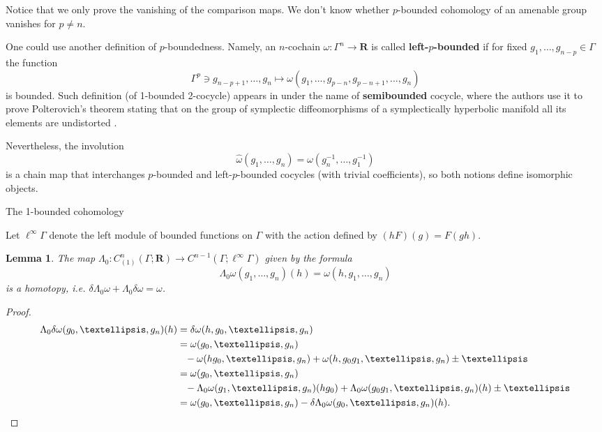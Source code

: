 \documentclass[12pt,reqno,a4paper]{amsart}
\makeatletter
\def\section{\@startsection{section}{1}%
  \z@{.7\linespacing\@plus\linespacing}{.5\linespacing}%
  {\normalfont\bfseries\raggedright\boldmath}}
\renewcommand{\emph}[1]{{\bfseries\boldmath #1}}
\newtheorem{lemma}[subsection]{Lemma}
\theoremstyle{definition}
\theoremstyle{remark}
\newenvironment{remark}
    {\pushQED{\qed}\renewcommand{\qedsymbol}{$\lozenge$}\remarkx}
    {\popQED\endremarkx}
\numberwithin{equation}{section}
\numberwithin{figure}{section}
\newcommand{\B}[1]{{\mathbf #1}}
\makeatother
\begin{document}
\begin{remark}
Notice that we only prove the vanishing of the comparison maps. We don't know
whether $p$-bounded cohomology of an amenable group vanishes for $p\neq n$.
\end{remark}

\begin{remark}  One could use another definition of $p$-boundedness.
Namely, an $n$-cochain
$\omega \colon \Gamma^n\to \B R$ is called \emph{left-$p$-bounded} if for fixed
$g_1,\dots,g_{n-p}\in \Gamma$ the function
$$
\Gamma^p\ni g_{n-p+1},\dots,g_n \mapsto \omega(g_1,\dots,g_{p-n},g_{p-n+1},\dots,g_n)
$$
is bounded.  Such definition (of 1-bounded 2-cocycle) appears in \cite[Section 4]{zbMATH06065373}
under the name of \emph{semibounded} cocycle, where the authors use it
to prove Polterovich's theorem stating that
on the group of symplectic diffeomorphisms of a symplectically hyperbolic
manifold all its elements are undistorted \cite[Theorem 5.2]{zbMATH06065373}.

Nevertheless, the involution
$$\widehat\omega(g_1,\dots,g_n)=\omega(g_n^{-1},\dots,g_1^{-1})
$$
is a chain map that interchanges $p$-bounded and left-$p$-bounded cocycles
(with trivial coefficients), so both notions define isomorphic objects.
\end{remark}


\section{The 1-bounded cohomology}\label{L:last}

Let $\ell^\infty\Gamma$ denote the left module of bounded functions on $\Gamma$
with the action defined by $(hF)(g)=F(gh)$.

\begin{lemma}\label{L:lgamma}
The map $\Lambda_0\colon C^n_{(1)}(\Gamma;\B R)\to C^{n-1}(\Gamma;\ell^\infty\Gamma)$
given by the formula
$$
\Lambda_0\omega(g_1,\dots,g_n)(h)=\omega(h,g_1,\dots,g_n)
$$
is a homotopy, \textit{i.e.} $\delta\Lambda_0\omega+\Lambda_0\delta\omega=\omega$.
\end{lemma}

\begin{proof}
\begin{align*}
\Lambda_0\delta\omega(g_0,\dots,g_n)(h)&=\delta\omega(h,g_0,\dots,g_n)\\
&=\omega(g_0,\dots,g_n)\\
&\hphantom{=}-\omega(hg_0,\dots,g_n)+\omega(h,g_0g_1,\dots,g_n)\pm\dots\\
&=\omega(g_0,\dots,g_n)\\
&\hphantom{=}-\Lambda_0\omega(g_1,\dots,g_n)(hg_0)+\Lambda_0\omega(g_0g_1,\dots,g_n)(h)\pm\dots\\
&=\omega(g_0,\dots,g_n)-\delta\Lambda_0\omega(g_0,\dots,g_n)(h).
\end{align*}
\end{proof}
\end{document}
